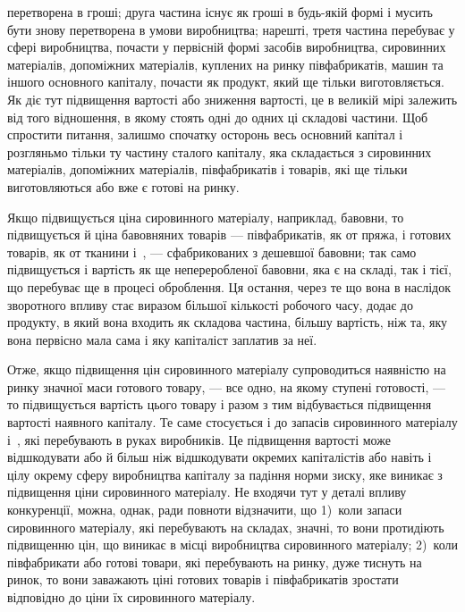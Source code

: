 \parcont{}  %
перетворена в гроші; друга частина існує як гроші в будь-якій
формі і мусить бути знову перетворена в умови виробництва;
нарешті, третя частина перебуває у сфері виробництва, почасти
у первісній формі засобів виробництва, сировинних матеріалів,
допоміжних матеріалів, куплених на ринку півфабрикатів,
машин та іншого основного капіталу, почасти як продукт, який
ще тільки виготовляється. Як діє тут підвищення вартості або
зниження вартості, це в великій мірі залежить від того відношення,
в якому стоять одні до одних ці складові частини. Щоб
спростити питання, залишмо спочатку осторонь весь основний
капітал і розгляньмо тільки ту частину сталого капіталу, яка
складається з сировинних матеріалів, допоміжних матеріалів,
півфабрикатів і товарів, які ще тільки виготовляються або вже
є готові на ринку.

Якщо підвищується ціна сировинного матеріалу, наприклад,
бавовни, то підвищується й ціна бавовняних товарів — півфабрикатів,
як от пряжа, і готових товарів, як от тканини і~, —
сфабрикованих з дешевшої бавовни; так само підвищується
і вартість як ще непереробленої бавовни, яка є на складі, так
і тієї, що перебуває ще в процесі оброблення. Ця остання,
через те що вона в наслідок зворотного впливу стає виразом
більшої кількості робочого часу, додає до продукту, в який
вона входить як складова частина, більшу вартість, ніж та, яку
вона первісно мала сама і яку капіталіст заплатив за неї.

Отже, якщо підвищення цін сировинного матеріалу супроводиться
наявністю на ринку значної маси готового товару, —
все одно, на якому ступені готовості, — то підвищується вартість
цього товару і разом з тим відбувається підвищення вартості
наявного капіталу. Те саме стосується і до запасів сировинного
матеріалу і~, які перебувають в руках виробників.
Це підвищення вартості може відшкодувати або й більш ніж
відшкодувати окремих капіталістів або навіть і цілу окрему
сферу виробництва капіталу за падіння норми зиску, яке виникає
з підвищення ціни сировинного матеріалу. Не входячи тут
у деталі впливу конкуренції, можна, однак, ради повноти відзначити,
що 1)~коли запаси сировинного матеріалу, які перебувають
на складах, значні, то вони протидіють підвищенню цін,
що виникає в місці виробництва сировинного матеріалу; 2)~коли
півфабрикати або готові товари, які перебувають на ринку, дуже
тиснуть на ринок, то вони заважають ціні готових товарів і півфабрикатів
зростати відповідно до ціни їх сировинного матеріалу.

